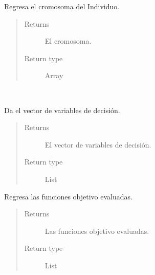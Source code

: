 \documentclass[class=report, crop=false]{standalone}
\begin{document}
\begin{fulllineitems}
\begin{fulllineitems}

Regresa el cromosoma del Individuo.

\begin{quote}\begin{description}
\item[{Returns}] \leavevmode
El cromosoma.
\item[{Return type}] \leavevmode
Array
\end{description}\end{quote}

\end{fulllineitems}

\begin{fulllineitems}

~
\vspace{-0.2cm}

Da el vector de variables de decisión.

\begin{quote}\begin{description}
\item[{Returns}] \leavevmode
El vector de variables de decisión.
\item[{Return type}] \leavevmode
List
\end{description}\end{quote}

\end{fulllineitems}

\begin{fulllineitems}

Regresa las funciones objetivo evaluadas.

\begin{quote}\begin{description}
\item[{Returns}] \leavevmode
Las funciones objetivo evaluadas.
\item[{Return type}] \leavevmode
List
\end{description}\end{quote}

\end{fulllineitems}


\end{fulllineitems}
\end{document}
